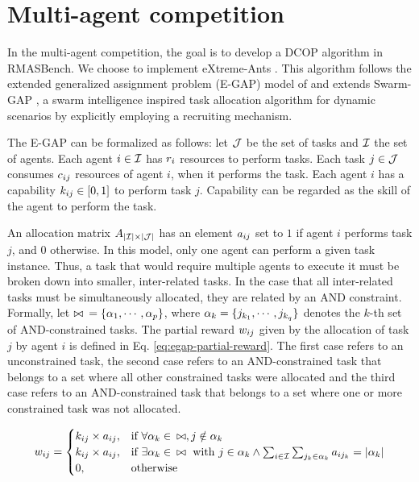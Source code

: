\section{Multi-agent competition}
\label{sec:multi-agent}

In the multi-agent competition, the goal is to develop a DCOP algorithm in RMASBench. We choose to implement eXtreme-Ants \citep{Santos&Bazzan2009optmas}. This algorithm follows the extended generalized assignment problem (E-GAP) model of \citep{Scerri+2005} and extends Swarm-GAP \citep{Ferreira+2008ccmms}, a swarm intelligence inspired task allocation algorithm for dynamic scenarios by explicitly employing a recruiting mechanism.

The E-GAP can be formalized as follows: let $\mathcal{J}$ be the set of tasks and $\mathcal{I}$ the set of agents. Each agent $i \in \mathcal{I}$ has $r_{i}$ resources to perform tasks. Each task $j \in \mathcal{J}$ consumes $c_{ij}$ resources of agent $i$, when it performs the task. Each agent $i$ has a capability $k_{ij} \in [0,1]$ to perform task $j$. Capability can be regarded as the skill of the agent to perform the task. %

An allocation matrix $A_{|\mathcal{I}| \times |\mathcal{J}|}$ has an element $a_{ij}$ set to $1$ if agent $i$ performs task $j$, and 0 otherwise. In this model, only one agent can perform a given task instance. Thus, a task that would require multiple agents to execute it must be broken down into smaller, inter-related tasks. In the case that all inter-related tasks must be simultaneously allocated, they are related by an AND constraint. 
Formally, let  $\bowtie \enspace = \{\alpha_{1},\cdots,\alpha_{p} \}$, where $\alpha_{k} = \{j_{k_1},\cdots,j_{k_q}\}$ denotes the $k$-th set of AND-constrained tasks. The partial reward $w_{ij}$ given by the allocation of task $j$ by agent $i$ is defined in Eq. \ref{eq:egap-partial-reward}. The first case refers to an unconstrained task, the second case refers to an AND-constrained task that belongs to a set where all other constrained tasks were allocated and the third case refers to an AND-constrained task that belongs to a set where one or more constrained task was not allocated.

\begin{equation}
\label{eq:egap-partial-reward}
\partialrwd{i}{j} = 
\begin{cases}
  \agtcap{i}{j} \times \allocate{i}{j} ,& \text{if } \forall\andtasks{k} \in \enspace \allandtasks, j \notin \andtasks{k}\\
  \agtcap{i}{j} \times \allocate{i}{j} ,& \text{if } \exists\andtasks{k} \in \enspace \allandtasks \text{ with } j \in \andtasks{k} \wedge \sum_{i \in \agentset}\sum_{j_k \in \andtasks{k}} \allocate{i}{j_k} = |\andtasks{k}| %
  \\
  0,& \text{otherwise}
\end{cases}
\end{equation}


